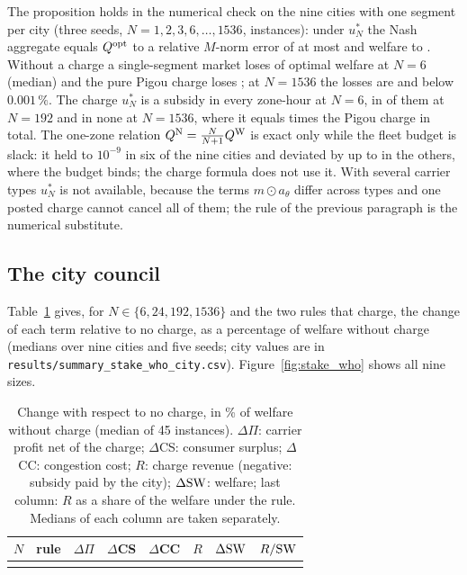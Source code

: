 The proposition holds in the numerical check on the nine cities with one segment per city (three seeds, $N=1,2,3,6,\dots,1536$, \IdRows{} instances): under $u_N^*$ the Nash aggregate equals $Q^{\mathrm{opt}}$ to a relative $M$-norm error of at most \IdQErr{} and welfare to \IdSWErr. Without a charge a single-segment market loses \pc{\IdSixNone} of optimal welfare at $N=6$ (median) and the pure Pigou charge loses \pc{\IdSixPig}; at $N=1536$ the losses are \pc{\IdBigNone} and below $0.001\,\%$. The charge $u^*_N$ is a subsidy in every zone-hour at $N=6$, in \pc{\IdOneNinetyTwoSub} of them at $N=192$ and in none at $N=1536$, where it equals \IdBigRatio{} times the Pigou charge in total. The one-zone relation $Q^{\mathrm{N}}=\frac N{N+1}Q^{\mathrm{W}}$ is exact only while the fleet budget is slack: it held to $10^{-9}$ in six of the nine cities and deviated by up to \pc{\IdRatioDevMax} in the others, where the budget binds; the charge formula does not use it. With several carrier types $u_N^*$ is not available, because the terms $m\odot a_\theta$ differ across types and one posted charge cannot cancel all of them; the rule of the previous paragraph is the numerical substitute.

\subsection{The city council}\label{sec:council}
Table~\ref{tab:stake_who} gives, for $N\in\{6,24,192,1536\}$ and the two rules that charge, the change of each term relative to no charge, as a percentage of welfare without charge (medians over nine cities and five seeds; city values are in \texttt{results/summary\_stake\_who\_city.csv}). Figure~\ref{fig:stake_who} shows all nine sizes.

\begin{table}[t]
\centering\footnotesize\setlength{\tabcolsep}{4pt}
\caption{Change with respect to no charge, in \% of welfare without charge (median of 45 instances). $\Delta\Pi$: carrier profit net of the charge; $\Delta$CS: consumer surplus; $\Delta$CC: congestion cost; $R$: charge revenue (negative: subsidy paid by the city); $\Delta\mathrm{SW}$: welfare; last column: $R$ as a share of the welfare under the rule. Medians of each column are taken separately.}\label{tab:stake_who}
\begin{tabular}{rlrrrrrr}
\toprule
$N$ & rule & $\Delta\Pi$ & $\Delta$CS & $\Delta$CC & $R$ & $\Delta\mathrm{SW}$ & $R/\mathrm{SW}$\\
\midrule
\\
\bottomrule
\end{tabular}
\end{table}

